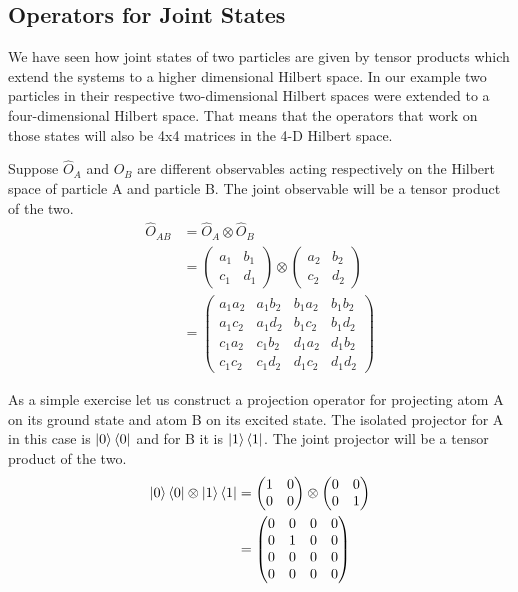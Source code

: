\subsection{Operators for Joint States}
\par We have seen how joint states of two particles are given by tensor products which extend the systems to a higher dimensional Hilbert space. In our example two particles in their respective two-dimensional Hilbert spaces were extended to a four-dimensional Hilbert space. That means that the operators that work on those states will also be 4x4 matrices in the 4-D Hilbert space.
\par Suppose $\hat{O}_A$ and $\hat{O}_B$ are different observables acting respectively on the Hilbert space of particle A and particle B. The joint observable will be a tensor product of the two.
\begin{align*}
  \hat{O}_{AB} &= \hat{O}_A \otimes \hat{O}_B \\
               &= \begin{pmatrix} a_1 & b_1 \\ c_1 & d_1 \end{pmatrix} \otimes \begin{pmatrix} a_2 & b_2 \\ c_2 & d_2 \end{pmatrix} \\
               &= \begin{pmatrix} 
                    a_1 a_2 & a_1 b_2 & b_1 a_2 & b_1 b_2 \\
                    a_1 c_2 & a_1 d_2 & b_1 c_2 & b_1 d_2 \\
                    c_1 a_2 & c_1 b_2 & d_1 a_2 & d_1 b_2 \\
                    c_1 c_2 & c_1 d_2 & d_1 c_2 & d_1 d_2
                  \end{pmatrix}
\end{align*}
\par As a simple exercise let us construct a projection operator for projecting atom A on its ground state and atom B on its excited state. The isolated projector for A in this case is $\ket{0} \bra{0}$ and for B it is $\ket{1} \bra{1}$. The joint projector will be a tensor product of the two.
\begin{align*}
  \ket{0} \bra{0} \otimes \ket{1} \bra{1} &= \begin{pmatrix} 1 & 0 \\ 0 & 0 \end{pmatrix} \otimes \begin{pmatrix} 0 & 0 \\ 0 & 1 \end{pmatrix} \\
  &= \begin{pmatrix} 0 & 0 & 0 & 0 \\ 0 & 1 & 0 & 0 \\ 0 & 0 & 0 & 0 \\ 0 & 0 & 0 & 0 \end{pmatrix}
\end{align*}
